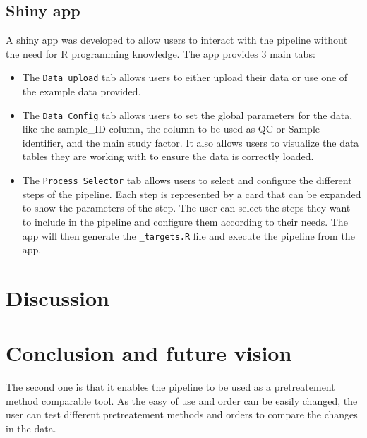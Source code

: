 \documentclass[ENG, BIB]{TFUOC}%
\begin{document}
\section{Shiny app}

A shiny app was developed to allow users to interact with the pipeline without the need for R programming knowledge. The app provides 3 main tabs:
\begin{itemize}
    \item The \texttt{Data upload} tab allows users to either upload their data or use one of the example data provided.
    \item The \texttt{Data Config} tab allows users to set the global parameters for the data, like the sample\_ID column, the column to be used as QC or Sample identifier, and the main study factor. It also allows users to visualize the data tables they are working with to ensure the data is correctly loaded.
    \item The \texttt{Process Selector} tab allows users to select and configure the different steps of the pipeline. Each step is represented by a card that can be expanded to show the parameters of the step. The user can select the steps they want to include in the pipeline and configure them according to their needs. The app will then generate the \texttt{\_targets.R} file and execute the pipeline from the app.
\end{itemize}

\chapter{Discussion}


\chapter{Conclusion and future vision}
The second one is that it enables the pipeline to be used as a pretreatement method comparable tool. As the easy of use and order can be easily changed, the user can test different pretreatement methods and orders to compare the changes in the data.
\end{document}
